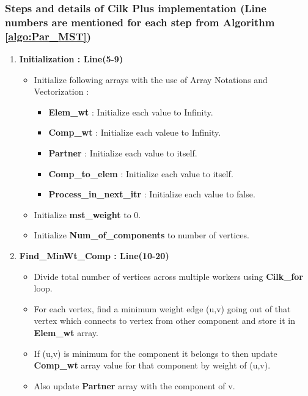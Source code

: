 \documentclass{article}
\begin{document}
\subsubsection{Steps and details of Cilk Plus implementation (Line numbers are mentioned for each step from Algorithm \ref{algo:Par_MST})} 
\begin{enumerate}


\item \textbf{Initialization : Line(5-9)}
\begin{itemize}
\item Initialize following arrays with the use of Array Notations and Vectorization :
\begin{itemize}
\item \textbf{Elem\_wt } : Initialize each value to Infinity.
\item \textbf{Comp\_wt} : Initialize each valeue to Infinity.
\item \textbf{Partner} : Initialize each value to itself.
\item \textbf{Comp\_to\_elem} : Initialize each value to itself.
\item \textbf{Process\_in\_next\_itr} : Initialize each value to false. \\
\end{itemize}
\item Initialize \textbf{mst\_weight} to 0. 
\item Initialize \textbf{Num\_of\_components} to number of vertices.
\end{itemize}


\item \textbf{Find\_MinWt\_Comp : Line(10-20)}
\begin{itemize}
\item Divide total number of vertices across multiple workers using \textbf{Cilk\_for} loop. \\
\item For each vertex, find a minimum weight edge (u,v) going out of that vertex which connects to vertex from other component and store it in \textbf{Elem\_wt} array.\\
\item If (u,v) is minimum for the component it belongs to then update \textbf{Comp\_wt} array value for that component by weight of (u,v).\\
\item Also update \textbf{Partner} array with the component of v. \\
\end{itemize}


\end{enumerate}
\end{document}
